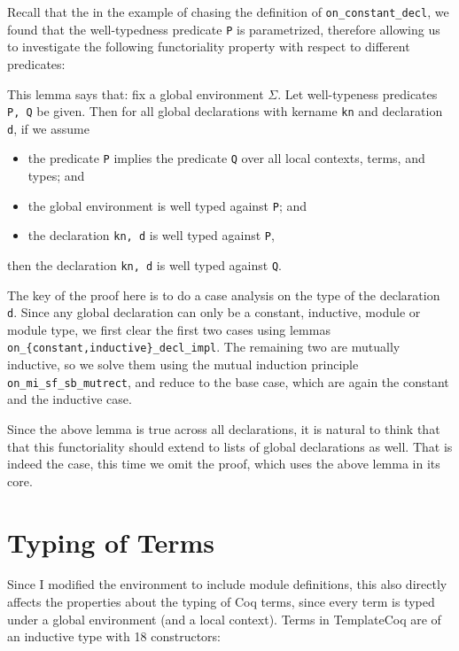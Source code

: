 Recall that the in the example of chasing the definition of
\verb|on_constant_decl|, we found that the well-typedness predicate \verb|P| is
parametrized, therefore allowing us to investigate the following functoriality
property with respect to different predicates:


This lemma says that: fix a global environment $\Sigma$. Let well-typeness
predicates \verb|P, Q| be given. Then for all global declarations with kername
\verb|kn| and declaration \verb|d|, if we assume
\begin{itemize}
  \item the predicate \verb|P| implies the predicate \verb|Q| over all local
  contexts, terms, and types; and
  \item the global environment is well typed against \verb|P|; and
  \item the declaration \verb|kn, d| is well typed against \verb|P|, 
\end{itemize}
then the declaration \verb|kn, d| is well typed against \verb|Q|.

The key of the proof here is to do a case analysis on the type of the
declaration \verb|d|. Since any global declaration can only be a constant,
inductive, module or module type, we first clear the first two cases using
lemmas \verb|on_{constant,inductive}_decl_impl|. The remaining two are mutually
inductive, so we solve them using the mutual induction principle
\verb|on_mi_sf_sb_mutrect|, and reduce to the base case, which are again the
constant and the inductive case.

Since the above lemma is true across all declarations, it is natural to think
that that this functoriality should extend to lists of global declarations as
well. That is indeed the case, this time we omit the proof, which uses the above
lemma in its core.




\section{Typing of Terms}
Since I modified the environment to include module definitions, this also
directly affects the properties about the typing of Coq terms, since every term
is typed under a global environment (and a local context). Terms in TemplateCoq
are of an inductive type with 18 constructors:

